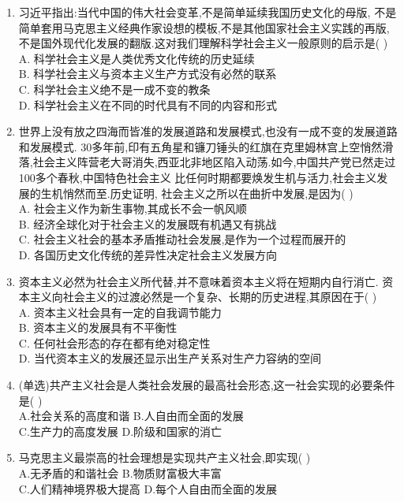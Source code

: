 \documentclass[12pt, a4paper, oneside, UTF8]{ctexbook}
\begin{document}
\begin{enumerate}
    \item 习近平指出:当代中国的伟大社会变革,不是简单延续我国历史文化的母版,
    不是简单套用马克思主义经典作家设想的模板,不是其他国家社会主义实践的再版,
    不是国外现代化发展的翻版.这对我们理解科学社会主义一般原则的启示是(   ) \\
    A. 科学社会主义是人类优秀文化传统的历史延续 \\
    B. 科学社会主义与资本主义生产方式没有必然的联系 \\
    C. 科学社会主义绝不是一成不变的教条 \\
    D. 科学社会主义在不同的时代具有不同的内容和形式 

    \item 世界上没有放之四海而皆准的发展道路和发展模式,也没有一成不变的发展道路和发展模式.
    30多年前,印有五角星和镰刀锤头的红旗在克里姆林宫上空悄然滑落,社会主义阵营老大哥消失,西亚北非地区陷入动荡.如今,中国共产党已然走过100多个春秋,中国特色社会主义
    比任何时期都要焕发生机与活力,社会主义发展的生机悄然而至.历史证明,
    社会主义之所以在曲折中发展,是因为(   ) \\
    A. 社会主义作为新生事物,其成长不会一帆风顺 \\
    B. 经济全球化对于社会主义的发展既有机遇又有挑战 \\
    C. 社会主义社会的基本矛盾推动社会发展,是作为一个过程而展开的 \\
    D. 各国历史文化传统的差异性决定社会主义发展方向

    \item 资本主义必然为社会主义所代替,并不意味着资本主义将在短期内自行消亡.
    资本主义向社会主义的过渡必然是一个复杂、长期的历史进程,其原因在于(   ) \\
    A. 资本主义社会具有一定的自我调节能力 \\
    B. 资本主义的发展具有不平衡性 \\
    C. 任何社会形态的存在都有绝对稳定性 \\
    D. 当代资本主义的发展还显示出生产关系对生产力容纳的空间

    \item (单选)共产主义社会是人类社会发展的最高社会形态,这一社会实现的必要条件是(   ) \\
    A.社会关系的高度和谐 \qquad
    B.人自由而全面的发展 \\
    C.生产力的高度发展 \qquad
    D.阶级和国家的消亡

    \item 马克思主义最崇高的社会理想是实现共产主义社会,即实现(   ) \\
    A.无矛盾的和谐社会 \qquad
    B.物质财富极大丰富 \\
    C.人们精神境界极大提高 \qquad
    D.每个人自由而全面的发展


\end{enumerate}
\end{document}
